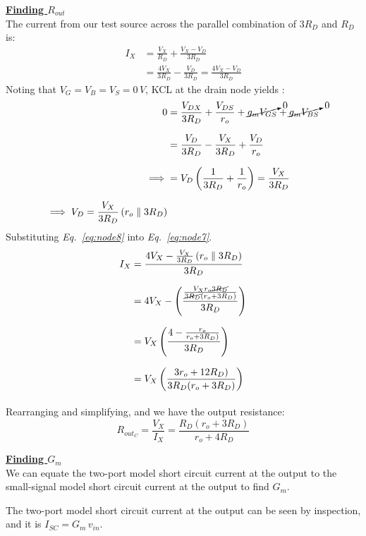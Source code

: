 \documentclass[12pt, fleqn]{article}
\begin{document}
\begin{enumerate}[label=(\alph*)]
{    \underline{\textbf{Finding $R_{out}$}}\\[0.25cm]
    The current from our test source across the parallel combination of ${3R}_D$ and $R_D$ is:
    \begin{align}
        I_X &= \frac{V_X}{R_D} + \frac{V_X - V_D}{{3R}_D}\\[0.25cm]
        &= \frac{4V_X}{{3R}_D} - \frac{V_D}{{3R}_D} = \frac{4V_X - V_D}{{3R}_D}
        \label{eq:node7}
    \end{align}
    Noting that $V_G = V_B = V_S = 0\,V$, KCL at the drain node yields :
    \begin{align}
        0 &= \frac{V_{DX}}{{3R}_D} + \frac{V_{DS}}{r_o} + \cancelto{0}{g_m V_{GS}} + \cancelto{0}{g_m V_{BS}}\\[0.25cm]
        &= \frac{V_D}{{3R}_D} - \frac{V_X}{{3R}_D} + \frac{V_D}{r_o}\\[0.25cm]
        \implies &= V_D\left(\frac{1}{{3R}_D} + \frac{1}{r_o}\right) = \frac{V_X}{{3R}_D}\\[0.25cm]
        \implies V_D = \frac{V_X}{{3R}_D}\left(r_o \parallel {3R}_D\right)
        \label{eq:node8}
    \end{align}
    Substituting \textit{Eq.~\ref{eq:node8}} into \textit{Eq.~\ref{eq:node7}}.
    \begin{align*}
        I_X &= \frac{4V_X - \frac{V_X}{{3R}_D}\left(r_o \parallel {3R}_D\right)}{{3R}_D}\\[0.25cm]
        &= 4V_X - \left(\frac{\frac{V_X r_o \cancel{{3R}_D}}{\cancel{{3R}_D}(r_o + {3R}_D)}}{{3R}_D}\right)\\[0.25cm]
        &= V_X\left(\frac{4 - \frac{r_o}{r_o + {3R}_D)}}{{3R}_D}\right)\\[0.25cm]
        &= V_X\left(\frac{3r_o + {12R}_D)}{{3R}_D(r_o + {3R}_D)}\right)\\[0.25cm]
    \end{align*}
    Rearranging and simplifying, and we have the output resistance:
    \begin{equation}
        \boxed{R_{{out}_C} = \frac{V_X}{I_X} = \frac{R_D(r_o + {3R}_D)}{r_o + {4R}_D}}
    \end{equation}
    
    \underline{\textbf{Finding $G_m$}}\\[0.25cm]
    We can equate the two-port model short circuit current at the output to the small-signal model short circuit current at the output to find $G_m$.
    
    The two-port model short circuit current at the output can be seen by inspection, and it is $I_{SC} = G_m\,v_{in}$.
    
}
\end{enumerate}
\end{document}
